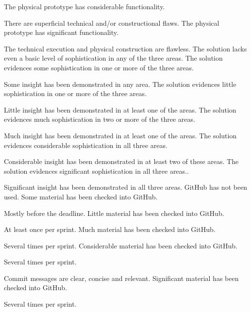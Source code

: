 \documentclass{../fal_assignment}
\begin{document}
\begin{markingrubric}
        \grade The physical prototype has considerable functionality.
            \par There are superficial technical and/or constructional flaws.
        \grade The physical prototype has significant functionality.
            \par The technical execution and physical construction are flawless.
        \grade\fail The solution lacks even a basic level of sophistication in any of the three areas.
        \grade The solution evidences some sophistication in one or more of the three areas.
            \par Some insight has been demonstrated in any area.
        \grade The solution evidences little sophistication in one or more of the three areas.
            \par Little insight has been demonstrated in at least one of the areas.
        \grade The solution evidences much sophistication in two or more of the three areas.
            \par Much insight has been demonstrated in at least one of the areas.
        \grade The solution evidences considerable sophistication in all three areas.
            \par Considerable insight has been demonstrated in at least two of these areas.
        \grade The solution evidences significant sophistication in all three areas..
            \par Significant insight has been demonstrated in all three areas.
        \grade\fail GitHub has not been used.
        \grade Some material has been checked into GitHub.
            \par Mostly before the deadline.
        \grade Little material has been checked into GitHub.
        	   \par  At least once per sprint.
        \grade Much material has been checked into GitHub.
        	   \par Several times per sprint.
        \grade Considerable material has been checked into GitHub.
        	    \par Several times per sprint.
            \par Commit messages are clear, concise and relevant.
        \grade Significant material has been checked into GitHub.
        	    \par Several times per sprint.

\end{markingrubric}
\end{document}
